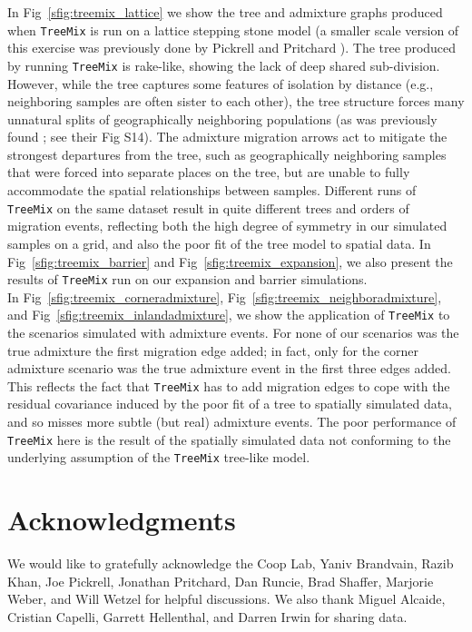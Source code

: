 \documentclass[10pt,letterpaper]{article}
\begin{document}
In Fig\ \ref{sfig:treemix_lattice} we show the tree and admixture graphs produced when
\texttt{TreeMix} is run on a lattice stepping stone model 
(a smaller scale version of this exercise was previously done by Pickrell and Pritchard \cite{Treemix}). 
The tree produced by running \texttt{TreeMix} is rake-like, showing the lack of deep shared sub-division. 
However, while the tree captures some features of isolation by distance 
(e.g., neighboring samples are often sister to each other), 
the tree structure forces many unnatural splits of geographically neighboring populations 
(as was previously found \cite{Treemix}; see their Fig S14). 
The admixture migration arrows act to mitigate the strongest departures from the tree, 
such as geographically neighboring samples that were forced into separate places on the tree,
but are unable to fully accommodate the spatial relationships between samples. 
 Different runs of \texttt{TreeMix} on the same dataset result in quite different trees and orders of migration events, 
 reflecting both the high degree of symmetry in our simulated samples on a grid, 
 and also the poor fit of the tree model to spatial data. 
In Fig\ \ref{sfig:treemix_barrier} and Fig\ \ref{sfig:treemix_expansion},
we also present the results of \texttt{TreeMix} run on our expansion and barrier simulations.\\

In Fig\ \ref{sfig:treemix_corneradmixture}, Fig\ \ref{sfig:treemix_neighboradmixture}, and Fig\ \ref{sfig:treemix_inlandadmixture},
we show the application of \texttt{TreeMix} to the scenarios simulated with admixture events.  
For none of our scenarios was the true admixture the first migration edge added; 
in fact, only for the corner admixture scenario was the true admixture
event in the first three edges added. 
This reflects the fact that \texttt{TreeMix} has to add migration edges to cope with the residual
covariance induced by the poor fit of a tree to spatially simulated data,
and so misses more subtle (but real) admixture events.
The poor performance of \texttt{TreeMix} here is the result of the 
spatially simulated data not conforming to the 
underlying assumption of the \texttt{TreeMix} tree-like model.

\section*{Acknowledgments}
We would like to gratefully acknowledge the Coop Lab, Yaniv Brandvain, Razib Khan, Joe Pickrell, 
Jonathan Pritchard, Dan Runcie, Brad Shaffer, Marjorie Weber, and Will Wetzel for helpful discussions.  
We also thank Miguel Alcaide, Cristian Capelli, Garrett Hellenthal, and Darren Irwin for sharing data.
\end{document}
